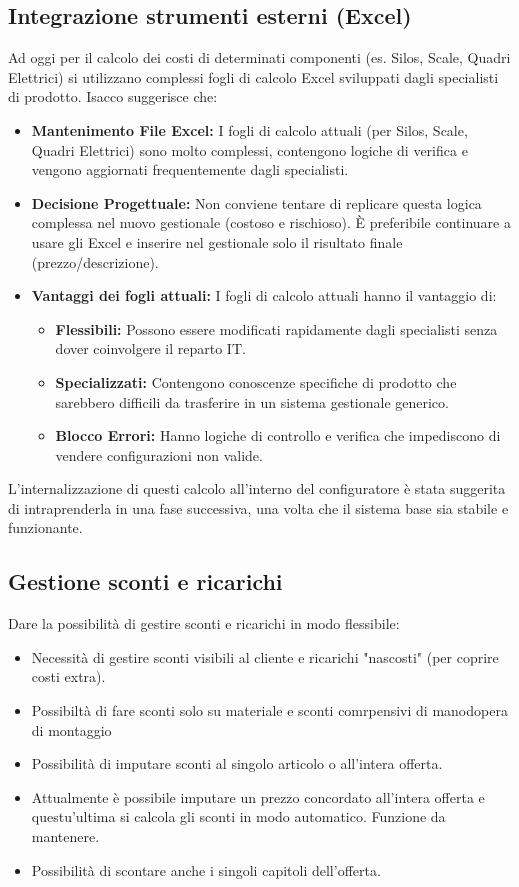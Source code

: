 \documentclass[12pt, a4paper]{article} %
\begin{document}
\subsection{Integrazione strumenti esterni (Excel)}
Ad oggi per il calcolo dei costi di determinati componenti (es. Silos, Scale,
Quadri Elettrici) si utilizzano complessi fogli di calcolo Excel sviluppati
dagli specialisti di prodotto. Isacco suggerisce che:
\begin{itemize}
      \item \textbf{Mantenimento File Excel:} I fogli di calcolo attuali (per Silos, Scale, Quadri Elettrici) sono molto complessi,
            contengono logiche di verifica e vengono aggiornati frequentemente dagli specialisti.
      \item \textbf{Decisione Progettuale:} Non conviene tentare di replicare questa logica complessa nel nuovo gestionale (costoso e rischioso).
            È preferibile continuare a usare gli Excel e inserire nel gestionale solo il risultato finale (prezzo/descrizione).
      \item \textbf{Vantaggi dei fogli attuali:}
            I fogli di calcolo attuali hanno il vantaggio di:
            \begin{itemize}
                  \item \textbf{Flessibili:} Possono essere modificati rapidamente dagli specialisti senza dover coinvolgere il reparto IT.
                  \item \textbf{Specializzati:} Contengono conoscenze specifiche di prodotto che sarebbero difficili da trasferire in un sistema gestionale generico.
                  \item \textbf{Blocco Errori:} Hanno logiche di controllo e verifica che impediscono di vendere configurazioni non valide.
            \end{itemize}
\end{itemize}
L'internalizzazione di questi calcolo all'interno del configuratore è stata suggerita di intraprenderla in una fase successiva, una volta che il sistema base sia
stabile e funzionante.

\subsection{Gestione sconti e ricarichi}
Dare la possibilità di gestire sconti e ricarichi in modo flessibile:
\begin{itemize}
      \item Necessità di gestire sconti visibili al cliente e ricarichi "nascosti" (per
            coprire costi extra).
      \item Possibiltà di fare sconti solo su materiale e sconti comrpensivi di manodopera
            di montaggio
      \item Possibilità di imputare sconti al singolo articolo o all'intera offerta.
      \item Attualmente è possibile imputare un prezzo concordato all'intera offerta e
            questu'ultima si calcola gli sconti in modo automatico. Funzione da mantenere.
      \item Possibilità di scontare anche i singoli capitoli dell'offerta.
\end{itemize}
\end{document}
